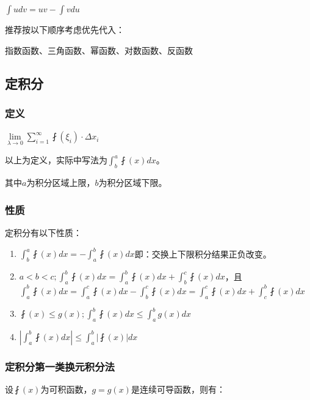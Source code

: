 \documentclass[UTF8]{ctexbook}
\newcommand{\limNormal}[1]{\lim\limits_{#1}}
\newcommand{\upDownSum}[2]{\sum\limits_{#2}^{#1}}
\newcommand{\defFunction}[1]{\fint(#1)}
\newcommand{\definiteIntegral}[2]{\int^{#1}_{#2}}
\begin{document}
{{{{    $\int udv = uv - \int v du$

    推荐按以下顺序考虑优先代入：

    指数函数、三角函数、幂函数、对数函数、反函数
  }%

}%

\subsection{定积分}{

\subsubsection{定义}{
  $\limNormal{\lambda \to 0}\upDownSum{\infty}{i = 1}\defFunction{\xi_i}\cdot\Delta x_i$

  以上为定义，实际中写法为$\definiteIntegral{a}{b}\defFunction{x}dx$。

  其中$a$为积分区域上限，$b$为积分区域下限。
}%

\subsubsection{性质}{
  定积分有以下性质：
  \begin{enumerate}
    \item $\definiteIntegral{a}{b}\defFunction{x}dx = -\definiteIntegral{b}{a}\defFunction{x}dx$即：交换上下限积分结果正负改变。
    \item $a < b < c; \definiteIntegral{b}{a}\defFunction{x}dx = \definiteIntegral{b}{a}\defFunction{x}dx + \definiteIntegral{c}{b}\defFunction{x}dx$，且$\definiteIntegral{b}{a}\defFunction{x}dx = \definiteIntegral{c}{a}\defFunction{x}dx - \definiteIntegral{c}{b}\defFunction{x}dx = \definiteIntegral{c}{a}\defFunction{x}dx + \definiteIntegral{b}{c}\defFunction{x}dx$
    \item $\defFunction{x} \leq g(x); \definiteIntegral{b}{a}\defFunction{x}dx \leq \definiteIntegral{b}{a}g(x)dx$
    \item $|\definiteIntegral{b}{a}\defFunction{x}dx|\leq\definiteIntegral{b}{a}|\defFunction{x}|dx$
  \end{enumerate}
}%

\subsubsection{定积分第一类换元积分法}{
  设$\defFunction{x}$为可积函数，$g = g(x)$是连续可导函数，则有：

}}}}
\end{document}
